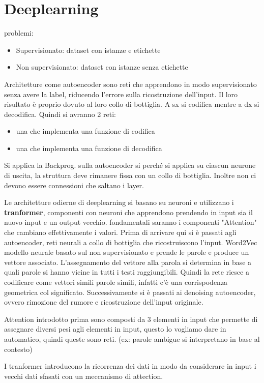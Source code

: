 \chapter{Deeplearning}
problemi:
\begin{itemize}
    \item Supervisionato: dataset con istanze e etichette
    \item Non supervisionato: dataset con istanze senza etichette
\end{itemize}
Architetture come autoencoder sono reti che apprendono in modo supervisionato
senza avere la label, riducendo l'errore sulla ricostruzione dell'input. Il loro
risultato è proprio dovuto al loro collo di bottiglia. A sx si codifica mentre a
dx si decodifica. Quindi si avranno 2 reti:
\begin{itemize}
    \item una che implementa una funzione di codifica
    \item una che implementa una funzione di decodifica
\end{itemize} 
Si applica la Backprog. sulla autoencoder si perché si applica su ciascun 
neurone di uscita, la struttura deve rimanere fissa con un collo di bottiglia.
Inoltre non ci devono essere connessioni che saltano i layer.

Le architetture odierne di deeplearning si basano su neuroni e utilizzano i 
\textbf{tranformer}, componenti con neuroni che apprendono prendendo in input
sia il nuovo input e un output vecchio. fondamentali saranno i componenti "Attention"
che cambiano effettivamente i valori. Prima di arrivare qui si è passati agli autoencoder,
reti neurali a collo di bottiglia che ricostruiscono l'input. 
Word2Vec modello neurale basato sul non supervisionato e prende le parole e produce 
un vettore associato. L'assegnamento del vettore alla parola si determina in base
a quali parole si hanno vicine in tutti i testi raggiungibili. Quindi la rete 
riesce a codificare come vettori simili parole simili, infatti c'è una corrispodenza
geometrica col significato. 
Successivamente si è passati ai denoising autoencoder, ovvero rimozione del rumore
e ricostruzione dell'input originale.

Attention introdotto prima sono composti da 3 elementi in input che permette di
assegnare diversi pesi agli elementi in input, questo lo vogliamo dare in automatico,
quindi queste sono reti. (ex: parole ambigue si interpretano in base al contesto)

I tranformer introducono la ricorrenza dei dati in modo da considerare in input
i vecchi dati sfasati con un meccanismo di attection.


